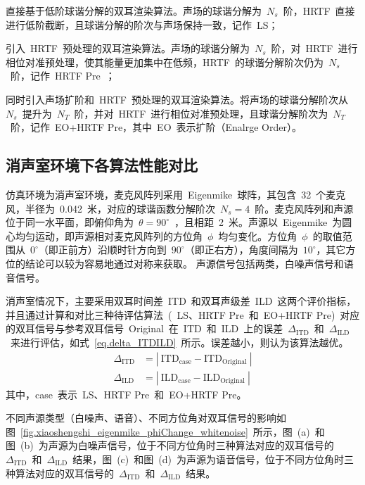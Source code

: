 \begin{inparaenum}[（1）]

\item 直接基于低阶球谐分解的双耳渲染算法。声场的球谐分解为~$N_{s}$~阶，HRTF~直接进行低阶截断，且球谐分解的阶次与声场保持一致，记作~LS；

\item 引入~HRTF~预处理的双耳渲染算法。声场的球谐分解为~$N_{s}$~阶，对~HRTF~进行相位对准预处理，使其能量更加集中在低频，HRTF~的球谐分解阶次仍为~$N_{s}$~阶，记作~HRTF Pre~；

\item 同时引入声场扩阶和~HRTF~预处理的双耳渲染算法。将声场的球谐分解阶次从~$N_{s}$~提升为~$N_{T}$~阶，并对~HRTF~进行相位对准预处理，且球谐分解阶次为~$N_{T}$~阶，记作~EO+HRTF Pre，其中~EO~表示扩阶（Enalrge Order）。

\end{inparaenum}

\subsection{消声室环境下各算法性能对比}

仿真环境为消声室环境，麦克风阵列采用~Eigenmike~球阵，其包含~32~个麦克风，半径为~0.042~米，对应的球谐函数分解阶次~$N_{s}=4$~阶。麦克风阵列和声源位于同一水平面，即俯仰角为~$\theta=90^{\circ}$~，且相距~2~米。声源以~Eigenmike~为圆心均匀运动，即声源相对麦克风阵列的方位角~$\phi$~均匀变化。方位角~$\phi$~的取值范围从~$0^{\circ}$（即正前方）沿顺时针方向到~$90^{\circ}$（即正右方），角度间隔为~$10^{\circ}$，其它方位的结论可以较为容易地通过对称来获取。
声源信号包括两类，白噪声信号和语音信号。

消声室情况下，主要采用双耳时间差~ITD~和双耳声级差~ILD~这两个评价指标，并且通过计算和对比三种待评估算法~(~LS、HRTF Pre~和~EO+HRTF Pre)~对应的双耳信号与参考双耳信号~Original~在~ITD~和~ILD~上的误差~$\Delta_{\text{ITD}}$~和~$\Delta_{\text{ILD}}$~来进行评估，如式~\eqref{eq.delta_ITDILD}~所示。误差越小，则认为该算法越优。
\begin{align}\label{eq.delta_ITDILD}
\Delta_{\text{ITD}}  &= \left|~ \text{ITD}_{\text{case}} - \text{ITD}_{\text{Original}} ~\right| \nonumber\\
\Delta_{\text{ILD}}  &= \left|~ \text{ILD}_{\text{case}} - \text{ILD}_{\text{Original}} ~\right|
\end{align}
其中，case~表示~LS、HRTF Pre~和~EO+HRTF Pre。


不同声源类型（白噪声、语音）、不同方位角对双耳信号的影响如图~\ref{fig.xiaoshengshi_eigenmike_phiChange_whitenoise}~所示，图~(a)~和图~(b)~为声源为白噪声信号，位于不同方位角时三种算法对应的双耳信号的~$\Delta_{\text{ITD}}$~和~$\Delta_{\text{ILD}}$~结果，图~(c)~和图~(d)~为声源为语音信号，位于不同方位角时三种算法对应的双耳信号的~$\Delta_{\text{ITD}}$~和~$\Delta_{\text{ILD}}$~结果。

